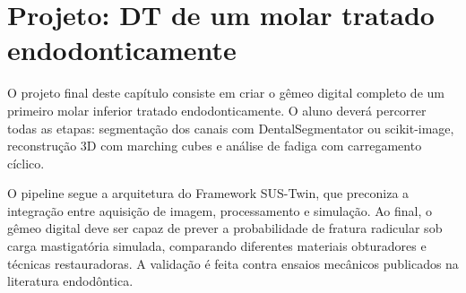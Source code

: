 \section{Projeto: DT de um molar tratado endodonticamente}

O projeto final deste capítulo consiste em criar o gêmeo digital completo de um primeiro molar inferior tratado endodonticamente. O aluno deverá percorrer todas as etapas: segmentação dos canais com DentalSegmentator ou scikit-image, reconstrução 3D com marching cubes e análise de fadiga com carregamento cíclico.

O pipeline segue a arquitetura do Framework SUS-Twin, que preconiza a integração entre aquisição de imagem, processamento e simulação. Ao final, o gêmeo digital deve ser capaz de prever a probabilidade de fratura radicular sob carga mastigatória simulada, comparando diferentes materiais obturadores e técnicas restauradoras. A validação é feita contra ensaios mecânicos publicados na literatura endodôntica.

